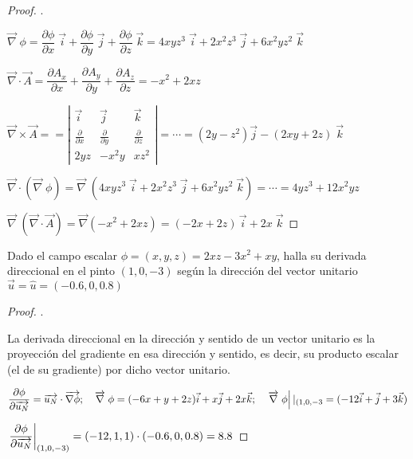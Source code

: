 \vspace{3mm}\begin{proof}\renewcommand{\qedsymbol}{$\diamond$}.

$\overrightarrow \nabla \; \phi= \dfrac {\partial \phi}{\partial x}\; \vec i + \dfrac {\partial \phi}{\partial y}\; \vec j + \dfrac {\partial \phi}{\partial z}\; \vec k = 4xyz^3\; \vec i + 2x^2z^3\; \vec j + 6x^2yz^2\; \vec k$

$\overrightarrow \nabla \cdot \overrightarrow A=\dfrac {\partial A_x}{\partial x } + \dfrac {\partial A_y}{\partial y }+ \dfrac {\partial A_z}{\partial z }= -x^2+2xz$

$\overrightarrow \nabla \times \overrightarrow A== \left|
\begin{matrix}
\vec i & \vec j	& \vec k \\
\frac {\partial}{\partial x} & \frac {\partial}{\partial y} & \frac {\partial}{\partial z} \\
2yz & -x^2y & xz^2
\end{matrix}  \right|=\cdots =(2y-z^2) \vec j - (2xy+2z)\; \vec k$

$\overrightarrow \nabla \cdot (\overrightarrow \nabla \; \phi)= \overrightarrow \nabla \; ( 4xyz^3\; \vec i + 2x^2z^3\; \vec j + 6x^2yz^2\; \vec k)= \cdots = 4yz^3+12x^2yz$

$\overrightarrow \nabla \; (\overrightarrow \nabla \cdot \overrightarrow A)  =\overrightarrow \nabla (-x^2+2xz)=(-2x+2z)\, \vec i + 2x \; \vec k$

\end{proof}

\vspace{3mm}\begin{ejre}
Dado el campo escalar $\phi=(x,y,z)=2xz-3x^2+xy$, halla su derivada direccional en el pinto $(1,0,-3)$ según la dirección del vector unitario $\vec u = \widehat { u } =(-0.6,0,0.8)$ 
\end{ejre}

\vspace{3mm}\begin{proof}\renewcommand{\qedsymbol}{$\diamond$}.

La derivada direccional en la dirección y sentido de un vector unitario es la proyección del gradiente en esa dirección y sentido, es decir, su producto escalar (el de su gradiente) por dicho vector unitario.

$\dfrac {\partial \phi}{\partial \overrightarrow {u_N}} = \overrightarrow {u_N} \cdot \overrightarrow {\nabla \phi}; \quad \overrightarrow \nabla \; \phi = (-6x+y+2z) \vec i + x \vec j + 2x \vec k; \quad \eval {\overrightarrow \nabla \; \phi}|_{(1,0,-3}=(-12\vec i + \vec j + 3\vec k)$

$\eval {\dfrac { \partial \phi }{ \partial \overrightarrow {u_N} } }_{(1,0,-3)} = (-12,1,1)\cdot(-0.6,0,0.8)=8.8$
	
\end{proof}


